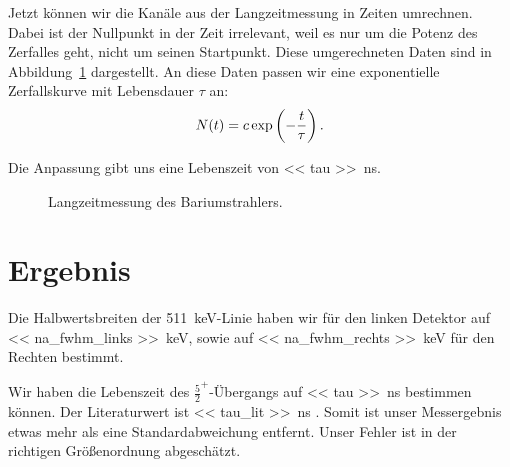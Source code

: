 Jetzt können wir die Kanäle aus der Langzeitmessung in Zeiten umrechnen. Dabei
ist der Nullpunkt in der Zeit irrelevant, weil es nur um die Potenz des
Zerfalles geht, nicht um seinen Startpunkt. Diese umgerechneten Daten sind in
Abbildung~\ref{fig:zerfall_daten} dargestellt. An diese Daten passen wir eine
exponentielle Zerfallskurve mit Lebensdauer $\tau$ an:
\[
    N(t) = c \exp\del{-\frac t\tau}.
\]

Die Anpassung gibt uns eine Lebenszeit von \SI{<< tau >>}{\nano\second}.

\begin{figure}[htbp]
    \centering
    \caption{%
        Langzeitmessung des Bariumstrahlers.
    }
    \label{fig:zerfall_daten}
\end{figure}


\chapter{Ergebnis}

Die Halbwertsbreiten der \SI{511}{\kilo\electronvolt}-Linie haben wir für den
linken Detektor auf \SI{<< na_fwhm_links >>}{\kilo\electronvolt}, sowie auf
\SI{<< na_fwhm_rechts >>}{\kilo\electronvolt} für den Rechten bestimmt.

Wir haben die Lebenszeit des $\frac 52^+$-Übergangs auf \SI{<< tau
>>}{\nano\second} bestimmen können. Der Literaturwert ist \SI{<< tau_lit
>>}{\nano\second} \parencite{gamma-133cs}. Somit ist unser Messergebnis etwas
mehr als eine Standardabweichung entfernt. Unser Fehler ist in der richtigen
Größenordnung abgeschätzt.

\IfFileExists{\bibliographyfile}{
    \printbibliography
}{}



